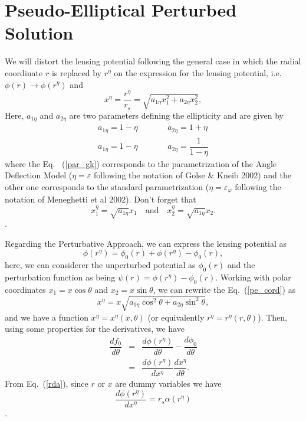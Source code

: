 \documentclass[a4paper,twoside,prd]{revtex4}
\def \rs {r_s}
\def \ret {r^\eta}
\def \po {\phi_0}
\def \al {\alpha}
\def \te {\theta}
\def \ae {a_{1\eta}}
\def \be {a_{2\eta}}
\def \xe {x^\eta}
\begin{document}
\section{\label{secpeper}Pseudo-Elliptical Perturbed Solution}
We will distort the lensing potential following the general case in which the radial coordinate $r$ is replaced by $\ret$ on 
the expression for the lensing potential, i.e. $\phi(r)\rightarrow\phi(\ret)$ and
\begin{equation}
\xe=\dfrac{\ret}{\rs}=\sqrt{\ae x_1^2+ \be x_2^2},
\label{pe_cord}
\end{equation}
Here, $\ae$ and $\be$ are two parameters defining the ellipticity and are given by
\begin{eqnarray}
\ae=1-\eta &\qquad& \be =1+\eta \label{par_gk}\\
\ae=1-\eta &\qquad & \be =\dfrac{1}{1-\eta} \label{par_gen}
\end{eqnarray}
where the Eq.~ (\ref{par_gk}) corresponds to the parametrization of the Angle Deflection Model ($\eta=\varepsilon$ following the notation of  Golse \& Kneib 2002) and the other one corresponds to the standard parametrization ($\eta=\varepsilon_\varphi$ following the notation of Meneghetti et al 2002). Don't forget that
\begin{equation*} x_1^\eta=\sqrt{\ae}x_1 \quad \textrm{and} \quad x_2^\eta=\sqrt{\ae}x_2. \end{equation*}.

Regarding the Perturbative Approach, we can express the lensing potential as
\begin{equation*}
\phi(\ret)=\po(r)+\phi(\ret)-\po(r),
\end{equation*}
here, we can considerer the unperturbed potential as $\po(r)$ and the perturbation function as being $\psi(r)=\phi(\ret)-\po(r)$.
Working with polar coordinates $x_1=x\cos{\te}$ and $x_2=x\sin{\te}$, we can rewrite the  Eq.~(\ref{pe_cord}) as
\begin{equation}
\xe=x\sqrt{\ae\cos^2{\te}+\be\sin^2{\te}},
\label{xepol}
\end{equation}
\noindent and we have a function $\xe=\xe(x,\te)$ (or equivalently $\ret=\ret(r,\te)$). Then, using some properties for the derivatives,
we have
\begin{eqnarray}
\dfrac{d f_0}{d\te}&=&\dfrac{d \phi(\ret)}{d \te}-\dfrac{d\po}{d\te} \nonumber \\
                   &=& \dfrac{d\phi(\ret)}{d\xe}\dfrac{d\xe}{d\te} \label{nfwdf0dt}.
\end{eqnarray}
From Eq.~(\ref{rda}), since $r$ or $x$ are dummy variables we have
\begin{equation*} \dfrac{d\phi(\ret)}{d\xe}=\rs\al(r^\eta) \end{equation*}.
\end{document}
